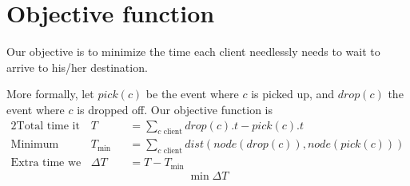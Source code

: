 \section{Objective function} \label{problem-formalization-objective}
Our objective is to minimize the time each client needlessly needs to wait to arrive to his/her destination.\par
More formally, let $pick(c)$ be the event where $c$ is picked up, and $drop(c)$ the event where $c$ is dropped off. Our objective function is
\begin{alignat*}{2}
    \text{Total time it took}        ~~& T        &&= \sum_{c \text{ client}}{drop(c).t - pick(c).t} \\
    \text{Minimum time it could take}~~& T_{\min} &&= \sum_{c \text{ client}}{dist(node(drop(c)), node(pick(c)))} \\
    \text{Extra time we must minimize}~~& \Delta T &&= T - T_{\min}
\end{alignat*}
\begin{equation*}
    \min \Delta T
\end{equation*}
